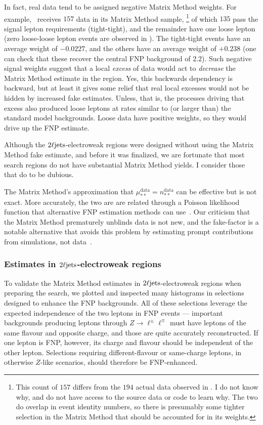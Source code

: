 In fact, real data tend to be assigned negative Matrix Method weights.
For example, \crvz\ receives $157$ data in its Matrix Method sample,%
\footnote{%
This count of $157$ differs from the $194$ actual data observed in \crvz.
I do not know why, and do not have access to the source data or code to
learn why.
The two do overlap in event identity numbers, so there is presumably some
tighter selection in the Matrix Method that should be accounted for in its
weights.
}
of which $135$ pass the signal lepton requirements (tight-tight),
and the remainder have one loose lepton (zero loose-loose lepton events
are observed in \crvz).
The tight-tight events have an average weight of $-0.0227$, and the others
have an average weight of $+0.238$ (one can check that these recover the
central FNP background of $2.2$).
Such negative signal weights suggest that a local \emph{excess} of data
would act to \emph{decrease} the Matrix Method estimate in the region.
Yes, this backwards dependency is backward, but at least it gives some relief
that real local excesses would not be hidden by increased fake estimates.
Unless, that is, the processes driving that excess also produced loose leptons
at rates similar to (or larger than) the standard model backgrounds.
Loose data have positive weights, so they would drive up the FNP estimate.

Although the $2\ell\mathrm{jets}$-electroweak regions were designed without using the
Matrix Method fake estimate, and before it was finalized, we are fortunate that
most search regions do not have substantial Matrix Method yields.
I consider those that do to be dubious.

The Matrix Method's approximation that
$\mu^\textrm{data}_{**} = n^\textrm{data}_{**}$ can be effective but is not
exact.
More accurately, the two are are related through a Poisson likelihood function
that alternative FNP estimation methods can use~\cite{
Erdmann:2021pqi,
Gillam:2014xua
}.
Our criticism that the Matrix Method prematurely unblinds data is not new, and
the fake-factor is a notable alternative that avoids this problem by estimating
prompt contributions from simulations, not data~\cite{
Alison2015,
ATLAS:2017ztq
}.

\subsubsection{%
Estimates in \texorpdfstring{$2\ell\mathrm{jets}$}{2Ljets}-electroweak regions%
}
\label{sec:2ljets_matrix_method_ewk}
To validate the Matrix Method estimates in $2\ell\mathrm{jets}$-electroweak regions
when preparing the search, we plotted and inspected many histograms in
selections designed to enhance the FNP backgrounds.
All of these selections leverage the expected independence of the two leptons
in FNP events --- important backgrounds producing leptons through
$Z\rightarrow \ell^\pm\ell^\mp$ must have leptons of the same flavour and
opposite charge, and those are quite accurately reconstructed.
If one lepton is FNP, however, its charge and flavour should be
independent of the other lepton.
Selections requiring different-flavour or same-charge leptons,
in otherwise $Z$-like scenarios, should therefore be
FNP-enhanced.

